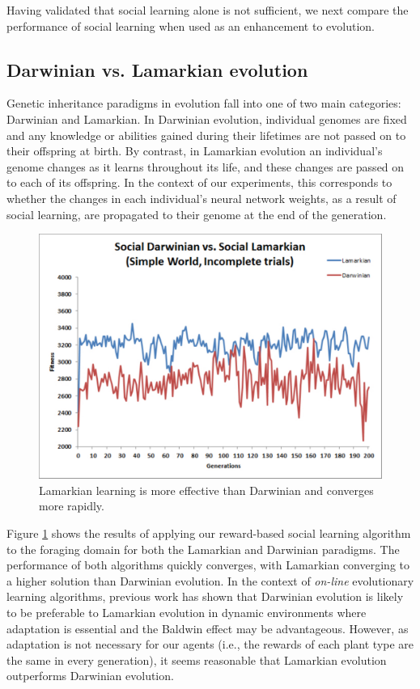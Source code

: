 \documentclass{acm_proc_article-sp}
\begin{document}
Having validated that social learning alone is not sufficient, we next compare the performance of social learning when used as an enhancement to evolution.


\subsection*{Darwinian vs. Lamarkian evolution}

Genetic inheritance paradigms in evolution fall into one of two main categories: Darwinian and Lamarkian. In Darwinian evolution, individual genomes are fixed and any knowledge or abilities gained during their lifetimes are not passed on to their offspring at birth. By contrast, in Lamarkian evolution an individual's genome changes as it learns throughout its life, and these changes are passed on to each of its offspring. In the context of our experiments, this corresponds to whether the changes in each individual's neural network weights, as a result of social learning, are propagated to their genome at the end of the generation.

\begin{figure}
  \centering
    \includegraphics[scale=.35]{darwinian_vs_lamarkian_evolution.pdf}
  \caption{Lamarkian learning is more effective than Darwinian and converges more rapidly.}
  \label{fig:darwin-lamark}
\end{figure}


Figure \ref{fig:darwin-lamark} shows the results of applying our reward-based social learning algorithm to the foraging domain for both the Lamarkian and Darwinian paradigms. The performance of both algorithms quickly converges, with Lamarkian converging to a higher solution than Darwinian evolution. In the context of \textit{on-line} evolutionary learning algorithms, previous work \cite{whiteson2006evolutionary} has shown that Darwinian evolution is likely to be preferable to Lamarkian evolution in dynamic environments where adaptation is essential and the Baldwin effect \cite{simpson1953baldwin} may be advantageous. However, as adaptation is not necessary for our agents (i.e., the rewards of each plant type are the same in every generation), it seems reasonable that Lamarkian evolution outperforms Darwinian evolution.
\end{document}
